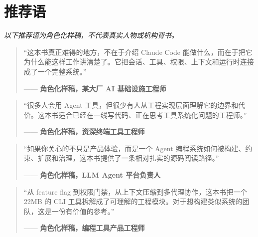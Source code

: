 \chapter*{推荐语}
\begin{sloppypar}

\begin{center}
  \small\itshape
  以下推荐语为角色化样稿，不代表真实人物或机构背书。
\end{center}

\bigskip

\begin{quotation}
  \noindent
  ``这本书真正难得的地方，不在于介绍 Claude Code 能做什么，而在于把它为什么能这样工作讲清楚了。它把会话、工具、权限、上下文和运行时连接成了一个完整系统。''

  \hfill —— \textbf{角色化样稿，某大厂 AI 基础设施工程师}
\end{quotation}

\bigskip

\begin{quotation}
  \noindent
  ``很多人会用 Agent 工具，但很少有人从工程实现层面理解它的边界和代价。这本书适合已经在一线写代码、正在思考工具系统化问题的工程师。''

  \hfill —— \textbf{角色化样稿，资深终端工具工程师}
\end{quotation}

\bigskip

\begin{quotation}
  \noindent
  ``如果你关心的不只是产品体验，而是一个 Agent 编程系统如何被构建、约束、扩展和治理，这本书提供了一条相对扎实的源码阅读路径。''

  \hfill —— \textbf{角色化样稿，LLM Agent 平台负责人}
\end{quotation}

\bigskip

\begin{quotation}
  \noindent
  ``从 feature flag 到权限门禁，从上下文压缩到多代理协作，这本书把一个 22MB 的 CLI 工具拆解成了可理解的工程模块。对于想构建类似系统的团队，这是一份有价值的参考。''

  \hfill —— \textbf{角色化样稿，编程工具产品工程师}
\end{quotation}
\end{sloppypar}
